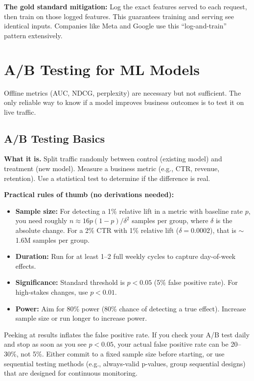 \textbf{The gold standard mitigation:} Log the exact features served to each request, then train on those logged features. This guarantees training and serving see identical inputs. Companies like Meta and Google use this ``log-and-train'' pattern extensively.

\section{A/B Testing for ML Models}
\label{sec:ab_testing}

Offline metrics (AUC, NDCG, perplexity) are necessary but not sufficient. The only reliable way to know if a model improves business outcomes is to test it on live traffic.

\subsection{A/B Testing Basics}

\textbf{What it is.} Split traffic randomly between control (existing model) and treatment (new model). Measure a business metric (e.g., CTR, revenue, retention). Use a statistical test to determine if the difference is real.

\textbf{Practical rules of thumb (no derivations needed):}
\begin{itemize}
    \item \textbf{Sample size:} For detecting a 1\% relative lift in a metric with baseline rate $p$, you need roughly $n \approx 16 p(1-p) / \delta^2$ samples per group, where $\delta$ is the absolute change. For a 2\% CTR with 1\% relative lift ($\delta = 0.0002$), that is $\sim$1.6M samples per group.
    \item \textbf{Duration:} Run for at least 1--2 full weekly cycles to capture day-of-week effects.
    \item \textbf{Significance:} Standard threshold is $p < 0.05$ (5\% false positive rate). For high-stakes changes, use $p < 0.01$.
    \item \textbf{Power:} Aim for 80\% power (80\% chance of detecting a true effect). Increase sample size or run longer to increase power.
\end{itemize}

\begin{warningbox}
Peeking at results inflates the false positive rate. If you check your A/B test daily and stop as soon as you see $p < 0.05$, your actual false positive rate can be 20--30\%, not 5\%. Either commit to a fixed sample size before starting, or use sequential testing methods (e.g., always-valid p-values, group sequential designs) that are designed for continuous monitoring.
\end{warningbox}

